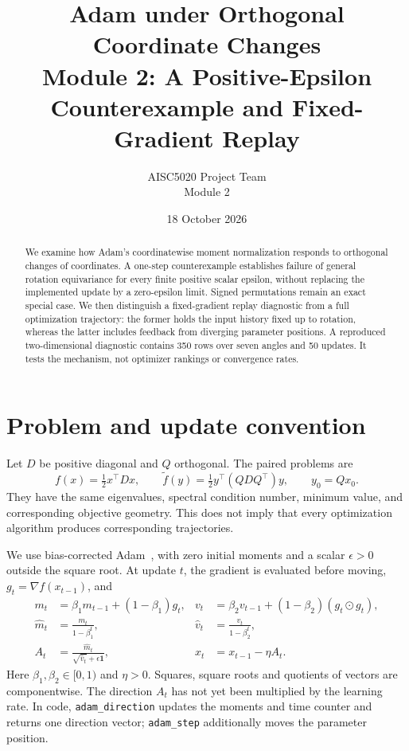 \documentclass[11pt,a4paper]{article}
\title{Adam under Orthogonal Coordinate Changes\\
\large Module 2: A Positive-Epsilon Counterexample and Fixed-Gradient Replay}
\author{AISC5020 Project Team\\Module 2}
\date{18 October 2026}
\begin{document}
\maketitle

\begin{abstract}
We examine how Adam's coordinatewise moment normalization responds to
orthogonal changes of coordinates. A one-step counterexample establishes
failure of general rotation equivariance for every finite positive scalar
epsilon, without replacing the implemented update by a zero-epsilon limit.
Signed permutations remain an exact special case. We then distinguish a
fixed-gradient replay diagnostic from a full optimization trajectory: the
former holds the input history fixed up to rotation, whereas the latter
includes feedback from diverging parameter positions. A reproduced
two-dimensional diagnostic contains 350 rows over seven angles and 50 updates.
It tests the mechanism, not optimizer rankings or convergence rates.
\end{abstract}

\section{Problem and update convention}
Let $D$ be positive diagonal and $Q$ orthogonal. The paired problems are
\[
 f(x)=\tfrac12x^\top Dx,\qquad
 \widetilde f(y)=\tfrac12y^\top(QDQ^\top)y,\qquad y_0=Qx_0.
\]
They have the same eigenvalues, spectral condition number, minimum value,
and corresponding objective geometry. This does not imply that every
optimization algorithm produces corresponding trajectories.

We use bias-corrected Adam~\cite{adam}, with zero initial moments and a scalar
$\epsilon>0$ outside the square root. At update $t$, the gradient is evaluated
before moving, $g_t=\nabla f(x_{t-1})$, and
\begin{align}
 m_t&=\beta_1m_{t-1}+(1-\beta_1)g_t,
 &v_t&=\beta_2v_{t-1}+(1-\beta_2)(g_t\odot g_t),\label{eq:moments}\\
 \widehat m_t&=\frac{m_t}{1-\beta_1^t},
 &\widehat v_t&=\frac{v_t}{1-\beta_2^t},\\
 A_t&=\frac{\widehat m_t}{\sqrt{\widehat v_t}+\epsilon\mathbf1},
 &x_t&=x_{t-1}-\eta A_t.\label{eq:direction}
\end{align}
Here $\beta_1,\beta_2\in[0,1)$ and $\eta>0$. Squares, square roots and
quotients of vectors are componentwise. The direction $A_t$ has not yet been
multiplied by the learning rate. In code, \texttt{adam\_direction} updates the
moments and time counter and returns one direction vector;
\texttt{adam\_step} additionally moves the parameter position.
\end{document}
